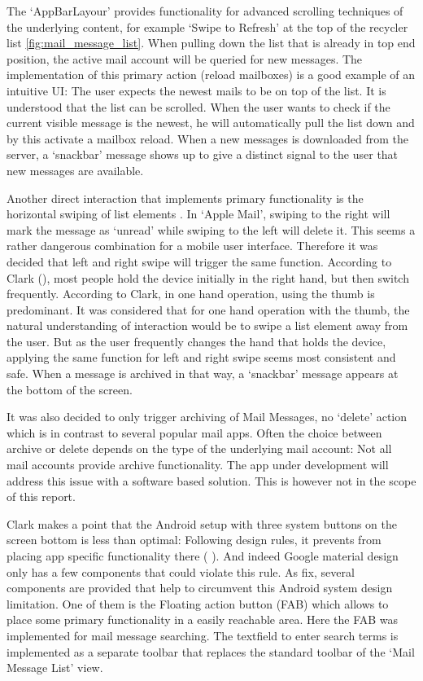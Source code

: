 \documentclass[a4paper,11pt,twoside]{article}
\begin{document}
The `AppBarLayour' provides functionality for advanced scrolling techniques of
the underlying content, for example `Swipe to Refresh' at the top of the
recycler list \ref{fig:mail_message_list}. When pulling down the list that is
already in top end position, the active mail account will be queried for new
messages. The implementation of this primary action (reload mailboxes) is a good
example of an intuitive UI: The user expects the newest mails to be on top of
the list. It is understood that the list can be scrolled. When the user wants to
check if the current visible message is the newest, he will automatically pull
the list down and by this activate a mailbox reload. When a new messages is
downloaded from the server, a `snackbar' message shows up to give a distinct
signal to the user that new messages are available.

Another direct interaction that implements primary functionality is the
horizontal swiping of list elements
\cite['Leave-behinds']{material_list_controls}. In `Apple Mail', swiping to the
right will mark the message as `unread' while swiping to the left will delete
it. This seems a rather dangerous combination for a mobile user interface.
Therefore it was decided that left and right swipe will trigger the same
function. According to Clark (\cite[chapter1, `Hold the phone']{clark2015}),
most people hold the device initially in the right hand, but then switch
frequently. According to Clark, in one hand operation, using the thumb is
predominant. It was considered  that for one hand operation with the thumb, the
natural understanding of interaction would be to swipe a list element away from
the user. But as the user frequently changes the hand that holds the device,
applying the same function for left and right swipe seems most consistent and
safe. When a message is archived in that way, a `snackbar' message appears at
the bottom of the screen.

It was also decided to only trigger archiving of Mail Messages, no `delete'
action  which is in contrast to several popular mail apps. Often the choice
between archive  or delete depends on the type of the underlying mail account:
Not all mail accounts provide archive functionality. The app under development
will address this issue with a software based solution. This is however not
in the scope of this report.

Clark makes a point that the Android setup with three system buttons on the
screen bottom is less than optimal: Following design rules, it prevents from
placing app specific functionality there  (
\cite[Chapter 1, 'Make Way for the Operating System']{clark2015}).
And indeed Google material design only  has a
few components that could violate this rule. As fix, several components are
provided that help to circumvent this Android system design limitation. One of
them is the Floating action button (FAB) which allows to place some primary
functionality in a easily reachable area. Here the FAB was implemented for mail
message searching. The textfield to enter search terms is implemented as
a separate toolbar that replaces the standard toolbar of the `Mail Message List'
view.
\end{document}
